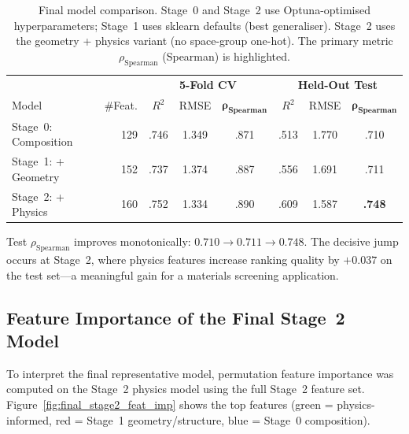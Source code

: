 \documentclass[11pt,a4paper]{article}
\newcommand{\Rtwo}{R^{2}}
\newcommand{\rhoS}{\rho_{\text{Spearman}}}
\begin{document}
\begin{table}[H]
      \centering
      \caption{Final model comparison.  Stage~0 and Stage~2 use Optuna-optimised
            hyperparameters; Stage~1 uses sklearn defaults (best generaliser).  Stage~2
            uses the geometry + physics variant (no space-group one-hot).  The primary
            metric $\rhoS$ (Spearman) is highlighted.}
      \label{tab:final}
      \small
      \begin{tabular}{lrccc|ccc}
            \toprule
                                 &         & \multicolumn{3}{c|}{\textbf{5-Fold CV}} & \multicolumn{3}{c}{\textbf{Held-Out Test}}                                                                 \\
            Model                & \#Feat. & $\Rtwo$                                 & RMSE                                       & $\boldsymbol{\rhoS}$ & $\Rtwo$ & RMSE  & $\boldsymbol{\rhoS}$ \\
            \midrule
            Stage~0: Composition & 129     & .746                                    & 1.349                                      & .871                 & .513    & 1.770 & .710                 \\
            Stage~1: + Geometry  & 152     & .737                                    & 1.374                                      & .887                 & .556    & 1.691 & .711                 \\
            Stage~2: + Physics   & 160     & .752                                    & 1.334                                      & .890                 & .609    & 1.587 & \textbf{.748}        \\
            \bottomrule
      \end{tabular}
\end{table}

Test $\rhoS$ improves monotonically: $0.710 \to 0.711 \to 0.748$.  The
decisive jump occurs at Stage~2, where physics features increase ranking
quality by $+0.037$ on the test set---a meaningful gain for a materials
screening application.

\subsection{Feature Importance of the Final Stage~2 Model}

To interpret the final representative model, permutation feature importance was
computed on the Stage~2 physics model using the full Stage~2 feature set.
Figure~\ref{fig:final_stage2_feat_imp} shows the top features (green =
physics-informed, red = Stage~1 geometry/structure, blue = Stage~0
composition).
\end{document}
